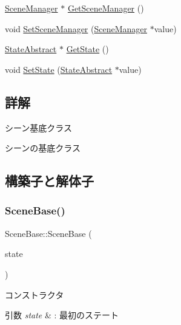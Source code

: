 \begin{DoxyCompactItemize}
\mbox{\hyperlink{class_scene_manager}{Scene\+Manager}} $\ast$ \mbox{\hyperlink{class_scene_base_acb723e2ffac570209ce4f0c8ffd14ab1}{Get\+Scene\+Manager}} ()
\item 
void \mbox{\hyperlink{class_scene_base_a8aecef8a97dcc1e1dcdf52c264cb388a}{Set\+Scene\+Manager}} (\mbox{\hyperlink{class_scene_manager}{Scene\+Manager}} $\ast$value)
\item 
\mbox{\hyperlink{class_scene_base_1_1_state_abstract}{State\+Abstract}} $\ast$ \mbox{\hyperlink{class_scene_base_a4d354583399a35400a5020e3d3628892}{Get\+State}} ()
\item 
void \mbox{\hyperlink{class_scene_base_ad2ca7b31e693a4cb2cb7ebb69f61bae2}{Set\+State}} (\mbox{\hyperlink{class_scene_base_1_1_state_abstract}{State\+Abstract}} $\ast$value)
\end{DoxyCompactItemize}


\subsection{詳解}
シーン基底クラス 

シーンの基底クラス 

\subsection{構築子と解体子}
\mbox{\label{class_scene_base_a0994a1f821d08732f78b7b7b71d3fcc4}} 
\subsubsection{\texorpdfstring{Scene\+Base()}{SceneBase()}}
{\footnotesize\ttfamily Scene\+Base\+::\+Scene\+Base (\begin{DoxyParamCaption}\item[{\mbox{\hyperlink{class_scene_base_1_1_state_abstract}{State\+Abstract}} $\ast$}]{state }\end{DoxyParamCaption})\hspace{0.3cm}{\ttfamily [inline]}}



コンストラクタ 


\begin{DoxyParams}{引数}
{\em state} & \+: 最初のステート \\
\hline
\end{DoxyParams}
\mbox{\label{class_scene_base_a187dd160e5a16909bcc6529851e38318}} 
